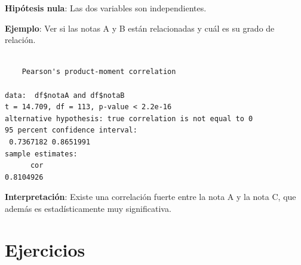 \documentclass[
  a4paper,
]{scrreport}
\newenvironment{Shaded}{\begin{snugshade}}{\end{snugshade}}
\newcommand{\CommentTok}[1]{\textcolor[rgb]{0.37,0.37,0.37}{#1}}
\newcommand{\FunctionTok}[1]{\textcolor[rgb]{0.28,0.35,0.67}{#1}}
\newcommand{\NormalTok}[1]{\textcolor[rgb]{0.00,0.23,0.31}{#1}}
\newcommand{\SpecialCharTok}[1]{\textcolor[rgb]{0.37,0.37,0.37}{#1}}
\theoremstyle{definition}
\theoremstyle{definition}
\theoremstyle{remark}
\begin{document}
\textbf{Hipótesis nula}: Las dos variables son independientes.

\textbf{Ejemplo}: Ver si las notas A y B están relacionadas y cuál es su
grado de relación.

\begin{Shaded}
\end{Shaded}

\begin{verbatim}

    Pearson's product-moment correlation

data:  df$notaA and df$notaB
t = 14.709, df = 113, p-value < 2.2e-16
alternative hypothesis: true correlation is not equal to 0
95 percent confidence interval:
 0.7367182 0.8651991
sample estimates:
      cor 
0.8104926 
\end{verbatim}

\textbf{Interpretación}: Existe una correlación fuerte entre la nota A y
la nota C, que además es estadísticamente muy significativa.

\section{Ejercicios}\label{ejercicios-6}
\end{document}
